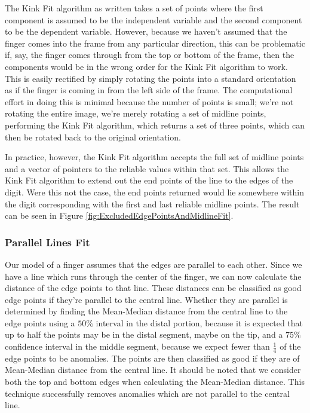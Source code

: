 The Kink Fit algorithm as written takes a set of points where the first component is assumed to be the independent variable and the second component to be the dependent variable. However, because we haven't assumed that the finger comes into the frame from any particular direction, this can be problematic if, say, the finger comes through from the top or bottom of the frame, then the components would be in the wrong order for the Kink Fit algorithm to work. This is easily rectified by simply rotating the points into a standard orientation as if the finger is coming in from the left side of the frame. The computational effort in doing this is minimal because the number of points is small; we're not rotating the entire image, we're merely rotating a set of midline points, performing the Kink Fit algorithm, which returns a set of three points, which can then be rotated back to the original orientation.

In practice, however, the Kink Fit algorithm accepts the full set of midline points and a vector of pointers to the reliable values within that set. This allows the Kink Fit algorithm to extend out the end points of the line to the edges of the digit. Were this not the case, the end points returned would lie somewhere within the digit corresponding with the first and last reliable midline points. The result can be seen in Figure \ref{fig:ExcludedEdgePointsAndMidlineFit}.

\subsubsection{Parallel Lines Fit}\label{sec:ParallelLinesFit}
Our model of a finger assumes that the edges are parallel to each other. Since we have a line which runs through the center of the finger, we can now calculate the distance of the edge points to that line. These distances can be classified as good edge points if they're parallel to the central line. Whether they are parallel is determined by finding the Mean-Median distance from the central line to the edge points using a $50\%$ interval in the distal portion, because it is expected that up to half the points may be in the distal segment, maybe on the tip, and a $75\%$ confidence interval in the middle segment, because we expect fewer than $\frac{1}{4}$ of the edge points to be anomalies. The points are then classified as good if they are of Mean-Median distance from the central line. It should be noted that we consider both the top and bottom edges when calculating the Mean-Median distance. This technique successfully removes anomalies which are not parallel to the central line.


